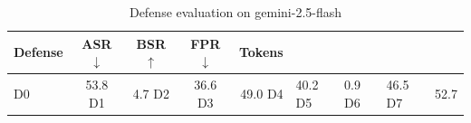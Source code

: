 \begin{table}[t]
\centering
\small
\begin{tabular}{l c c c r}
\toprule
Defense & ASR $\downarrow$ & BSR $\uparrow$ & FPR $\downarrow$ & Tokens \\
\midrule
D0 & 53.8%
D1 & 4.7%
D2 & 36.6%
D3 & 49.0%
D4 & 40.2%
D5 & 0.9%
D6 & 46.5%
D7 & 52.7%
\bottomrule
\end{tabular}
\caption{Defense evaluation on gemini-2.5-flash}
\label{tab:results_gemini_2.5_flash}
\end{table}